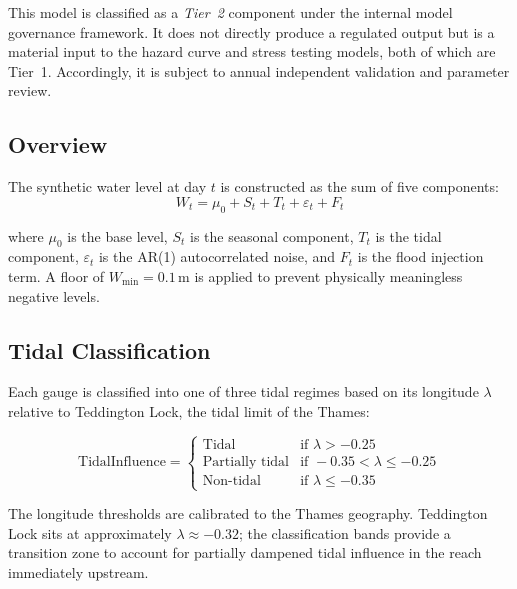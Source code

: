 \documentclass[11pt,a4paper]{article}
\begin{document}
This model is classified as a \emph{Tier~2} component under the internal model
governance framework. It does not directly produce a regulated output but is a
material input to the hazard curve and stress testing models, both of which are
Tier~1. Accordingly, it is subject to annual independent validation and parameter
review.

\mkmframework

\subsection{Overview}

The synthetic water level at day $t$ is constructed as the sum of five components:
\begin{equation}
    W_t = \mu_0 + S_t + T_t + \varepsilon_t + F_t
    \label{eq:total_level}
\end{equation}

\noindent where $\mu_0$ is the base level, $S_t$ is the seasonal component, $T_t$ is the
tidal component, $\varepsilon_t$ is the AR(1) autocorrelated noise, and $F_t$ is the
flood injection term. A floor of $W_{\min} = 0.1$\,m is applied to prevent physically
meaningless negative levels.

\subsection{Tidal Classification}
\label{sec:tidal_class}

Each gauge is classified into one of three tidal regimes based on its longitude
$\lambda$ relative to Teddington Lock, the tidal limit of the Thames:

\begin{equation}
    \text{TidalInfluence} =
    \begin{cases}
        \text{Tidal}            & \text{if } \lambda > -0.25 \\
        \text{Partially tidal}  & \text{if } -0.35 < \lambda \le -0.25 \\
        \text{Non-tidal}        & \text{if } \lambda \le -0.35
    \end{cases}
    \label{eq:tidal_class}
\end{equation}

\noindent The longitude thresholds are calibrated to the Thames geography. Teddington Lock
sits at approximately $\lambda \approx -0.32$; the classification bands provide a
transition zone to account for partially dampened tidal influence in the reach immediately
upstream.
\end{document}
